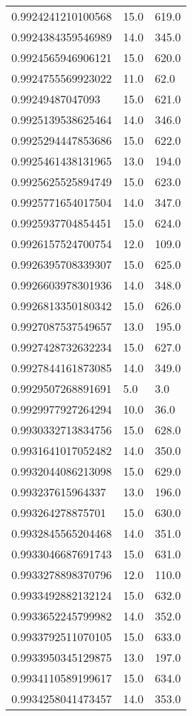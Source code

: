 \begin{center}
\begin{supertabular}[H]{p{0.30\textwidth}p{0.05\textwidth}p{0.05\textwidth}}
0.9924241210100568 & 15.0 & 619.0 \\ 
0.9924384359546989 & 14.0 & 345.0 \\ 
0.9924565946906121 & 15.0 & 620.0 \\ 
0.9924755569923022 & 11.0 & 62.0 \\ 
0.99249487047093 & 15.0 & 621.0 \\ 
0.9925139538625464 & 14.0 & 346.0 \\ 
0.9925294447853686 & 15.0 & 622.0 \\ 
0.9925461438131965 & 13.0 & 194.0 \\ 
0.9925625525894749 & 15.0 & 623.0 \\ 
0.9925771654017504 & 14.0 & 347.0 \\ 
0.9925937704854451 & 15.0 & 624.0 \\ 
0.9926157524700754 & 12.0 & 109.0 \\ 
0.9926395708339307 & 15.0 & 625.0 \\ 
0.9926603978301936 & 14.0 & 348.0 \\ 
0.9926813350180342 & 15.0 & 626.0 \\ 
0.9927087537549657 & 13.0 & 195.0 \\ 
0.9927428732632234 & 15.0 & 627.0 \\ 
0.9927844161873085 & 14.0 & 349.0 \\ 
0.9929507268891691 & 5.0 & 3.0 \\ 
0.9929977927264294 & 10.0 & 36.0 \\ 
0.9930332713834756 & 15.0 & 628.0 \\ 
0.9931641017052482 & 14.0 & 350.0 \\ 
0.9932044086213098 & 15.0 & 629.0 \\ 
0.993237615964337 & 13.0 & 196.0 \\ 
0.993264278875701 & 15.0 & 630.0 \\ 
0.9932845565204468 & 14.0 & 351.0 \\ 
0.9933046687691743 & 15.0 & 631.0 \\ 
0.9933278898370796 & 12.0 & 110.0 \\ 
0.9933492882132124 & 15.0 & 632.0 \\ 
0.9933652245799982 & 14.0 & 352.0 \\ 
0.9933792511070105 & 15.0 & 633.0 \\ 
0.9933950345129875 & 13.0 & 197.0 \\ 
0.9934110589199617 & 15.0 & 634.0 \\ 
0.9934258041473457 & 14.0 & 353.0 \\ 

\end{supertabular}
\end{center}
